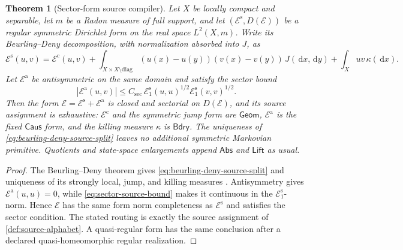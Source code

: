 \documentclass[11pt]{article}
\numberwithin{section}{part}
\theoremstyle{plain}
\newtheorem{theorem}{Theorem}[section]
\theoremstyle{definition}
\theoremstyle{remark}
\newcommand{\dd}{\,\mathrm d}
\newcommand{\Geom}{\mathsf{Geom}}
\newcommand{\Caus}{\mathsf{Caus}}
\newcommand{\Abs}{\mathsf{Abs}}
\newcommand{\Lift}{\mathsf{Lift}}
\newcommand{\Bdry}{\mathsf{Bdry}}
\begin{document}
\begin{theorem}[Sector-form source compiler]
\label{thm:sector-form-source-compiler}
Let \(X\) be locally compact and separable, let \(m\) be a Radon measure of
full support, and let \((\mathcal E^{\mathrm s},D(\mathcal E))\) be a
regular symmetric Dirichlet form on the real space \(L^2(X,m)\).  Write its
Beurling--Deny decomposition, with normalization absorbed into \(J\), as
\begin{equation}
 \label{eq:beurling-deny-source-split}
 \mathcal E^{\mathrm s}(u,v)
 =\mathcal E^{\mathrm c}(u,v)
 +\int_{X\times X\setminus\mathrm{diag}}
   (u(x)-u(y))(v(x)-v(y))\,J(\dd x,\dd y)
 +\int_Xuv\,\kappa(\dd x).
\end{equation}
Let \(\mathcal E^{\mathrm a}\) be antisymmetric on the same domain and
satisfy the sector bound
\begin{equation}
 \label{eq:sector-source-bound}
 |\mathcal E^{\mathrm a}(u,v)|
 \le C_{\mathrm{sec}}\,
   \mathcal E^{\mathrm s}_1(u,u)^{1/2}
   \mathcal E^{\mathrm s}_1(v,v)^{1/2}.
\end{equation}
Then the form
\(\mathcal E=\mathcal E^{\mathrm s}+\mathcal E^{\mathrm a}\) is closed and
sectorial on \(D(\mathcal E)\), and its source assignment is exhaustive:
\(\mathcal E^{\mathrm c}\) and the symmetric jump form are \(\Geom\),
\(\mathcal E^{\mathrm a}\) is the fixed \(\Caus\) form, and the killing
measure \(\kappa\) is \(\Bdry\).  The uniqueness of
\eqref{eq:beurling-deny-source-split} leaves no additional symmetric
Markovian primitive.  Quotients and state-space enlargements append
\(\Abs\) and \(\Lift\) as usual.
\end{theorem}

\begin{proof}
The Beurling--Deny theorem gives
\eqref{eq:beurling-deny-source-split} and uniqueness of its strongly local,
jump, and killing measures
\citep{FukushimaOshimaTakeda2011}.  Antisymmetry gives
\(\mathcal E^{\mathrm a}(u,u)=0\), while
\eqref{eq:sector-source-bound} makes it continuous in the
\(\mathcal E^{\mathrm s}_1\)-norm.  Hence \(\mathcal E\) has the same form
norm completeness as \(\mathcal E^{\mathrm s}\) and satisfies the sector
condition.  The stated routing is exactly the source assignment of
\cref{def:source-alphabet}.  A quasi-regular form has the same conclusion
after a declared quasi-homeomorphic regular realization.
\end{proof}
\end{document}
